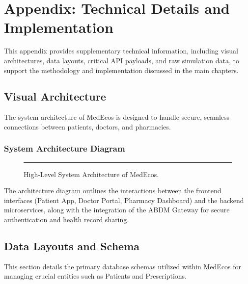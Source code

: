 \chapter{Appendix: Technical Details and Implementation}
\label{app:technical_details}

This appendix provides supplementary technical information, including visual architectures, data layouts, critical API payloads, and raw simulation data, to support the methodology and implementation discussed in the main chapters.

\section{Visual Architecture}
The system architecture of MedEcos is designed to handle secure, seamless connections between patients, doctors, and pharmacies. 

\subsection{System Architecture Diagram}
\begin{figure}[h!]
    \centering
    \rule{0.8\textwidth}{0.4\textwidth} %
    \caption{High-Level System Architecture of MedEcos.}
    \label{fig:app_system_arch}
\end{figure}

The architecture diagram outlines the interactions between the frontend interfaces (Patient App, Doctor Portal, Pharmacy Dashboard) and the backend microservices, along with the integration of the ABDM Gateway for secure authentication and health record sharing.

\section{Data Layouts and Schema}
This section details the primary database schemas utilized within MedEcos for managing crucial entities such as Patients and Prescriptions.

